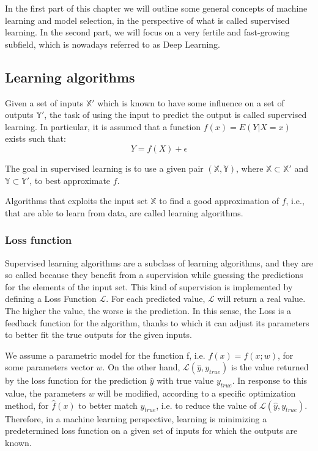 \documentclass[a4paper, twoside]{article}
\begin{document}
 In the first part of this chapter we will outline some general concepts of machine learning and model selection, in the perspective of what is called supervised learning. In the second part, we will focus on a very fertile and fast-growing subfield, which is nowadays referred to as Deep Learning.

    \subsection{Learning algorithms}
     Given a set of inputs $\mathbb{X}'$ which is known to have some influence on a set of outputs $\mathbb{Y}'$, the task of using the input to predict the output is called supervised learning. In particular, it is assumed that a function $f(x) = E(Y | X = x) $ exists such that:
     $$ Y = f(X) + \epsilon$$


     The goal in supervised learning is to use a given pair $(\mathbb{X}, \mathbb{Y})$, where $ \mathbb{X}\subset\mathbb{X}'$ and $ \mathbb{Y}\subset\mathbb{Y}'$, to best approximate $f$.

     Algorithms that exploits the input set $\mathbb{X}$ to find a good approximation of $f$, i.e., that are able to learn from data, are called learning algorithms.

         \subsubsection{Loss function}
         Supervised learning algorithms are a subclass of learning algorithms, and they are so called because they benefit from a supervision while guessing the predictions for the elements of the input set. This kind of supervision is implemented by defining a Loss Function $\mathcal{L}$. For each predicted value, $\mathcal{  L}$ will return a real value. The higher the value, the worse is the prediction. In this sense, the Loss is a feedback function for the algorithm, thanks to which it can adjust its parameters to better fit the true outputs for the given inputs.

         We assume a parametric model for the function f, i.e. $f(x) = f(x; w)$, for some parameters vector $w$. On the other hand, $\mathcal{L}(\hat{y}, y_{true})$ is the value returned by the loss function for the prediction $\hat{y}$ with true value $y_{true}$. In response to this value, the parameters $w$ will be modified, according to a specific optimization method, for $\hat{f}(x)$ to better match $y_{true}$, i.e. to reduce the value of $\mathcal{L}(\hat{y}, y_{true})$.
         Therefore, in a machine learning perspective, learning is minimizing a predetermined loss function on a given set of inputs for which the outputs are known.
\end{document}
